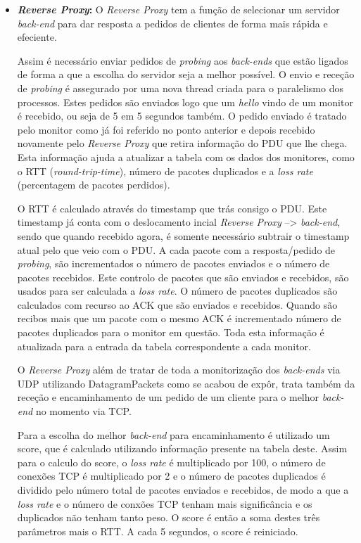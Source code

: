 \documentclass{llncs}
\begin{document}
\begin{itemize}
	\item \textbf{\textit{Reverse Proxy}:} O \textit{Reverse Proxy} tem a função de selecionar um servidor \textit{back-end} para dar resposta a pedidos de clientes de forma mais rápida e efeciente.\par 
	 Assim é necessário enviar pedidos de \textit{probing} aos \textit{back-ends} que estão ligados de forma a que a escolha do servidor seja a melhor possível. O envio e receção de \textit{probing} é assegurado por uma nova thread criada para o paralelismo dos processos. Estes pedidos são enviados logo que um \textit{hello} vindo de um monitor é recebido, ou seja de 5 em 5 segundos também. O pedido enviado é tratado pelo monitor como já foi referido no ponto anterior e depois recebido novamente pelo \textit{Reverse Proxy} que retira informação do PDU que lhe chega. Esta informação ajuda a atualizar a tabela com os dados dos monitores, como o RTT (\textit{round-trip-time}), número de pacotes duplicados e a \textit{loss rate} (percentagem de pacotes perdidos).\par 
	O RTT é calculado através do timestamp que trás consigo o PDU. Este timestamp já conta com o deslocamento incial \textit{Reverse Proxy} --> \textit{back-end}, sendo que quando recebido agora, é somente necessário subtrair o timestamp atual pelo que veio com o PDU. A cada pacote com a resposta/pedido de \textit{probing}, são incrementados o número de pacotes enviados e o número de pacotes recebidos. Este controlo de pacotes que são enviados e recebidos, são usados para ser calculada a \textit{loss rate}. O número de pacotes duplicados são calculados com recurso ao ACK que são enviados e recebidos. Quando são recibos mais que um pacote com o mesmo ACK é incrementado número de pacotes duplicados para o monitor em questão. Toda esta informação é atualizada para a entrada da tabela correspondente a cada monitor.\par
	O \textit{Reverse Proxy} além de tratar de toda a monitorização dos \textit{back-ends} via UDP utilizando DatagramPackets como se acabou de expôr, trata também da receção e encaminhamento de um pedido de um cliente para o melhor \textit{back-end} no momento via TCP.\par
	Para a escolha do melhor \textit{back-end} para encaminhamento é utilizado um score, que é calculado utilizando informação presente na tabela deste. Assim para o calculo do score, o \textit{loss rate} é multiplicado por 100, o número de conexões TCP é multiplicado por 2 e o número de pacotes duplicados é dividido pelo número total de pacotes enviados e recebidos, de modo a que a \textit{loss rate} e o número de conxões TCP tenham mais significância e os duplicados não tenham tanto peso. O score é então a soma destes três parâmetros mais o RTT. A cada 5 segundos, o score é reiniciado.\par

\end{itemize}
\end{document}
